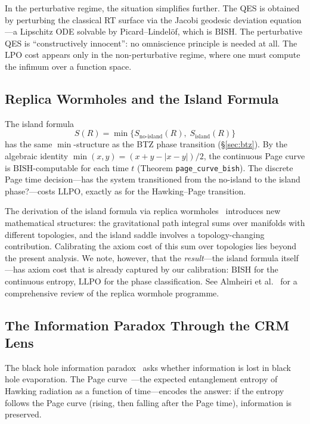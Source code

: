 \documentclass[11pt,a4paper]{article}
\theoremstyle{plain}
\theoremstyle{definition}
\newcommand{\LPO}{\ensuremath{\mathrm{LPO}}}
\newcommand{\LLPO}{\ensuremath{\mathrm{LLPO}}}
\newcommand{\BISH}{\ensuremath{\mathrm{BISH}}}
\begin{document}
In the perturbative regime, the situation simplifies further.
The QES is obtained by perturbing the classical RT surface via the
Jacobi geodesic deviation equation---a Lipschitz ODE solvable by
Picard--Lindel\"of, which is $\BISH$.  The perturbative QES is
``constructively innocent'': no omniscience principle is needed at all.
The $\LPO$ cost appears only in the non-perturbative regime, where
one must compute the infimum over a function space.

\subsection{Replica Wormholes and the Island Formula}

The island formula~\cite{AEMM2019,Penington2019}
\[
  S(R) = \min\bigl\{S_{\text{no-island}}(R),\;
  S_{\text{island}}(R)\bigr\}
\]
has the same $\min$-structure as the BTZ phase transition (\S\ref{sec:btz}).
By the algebraic identity $\min(x,y) = (x+y-|x-y|)/2$,
the continuous Page curve is $\BISH$-computable for each time $t$
(Theorem \texttt{page\_curve\_bish}).  The discrete Page time
decision---has the system transitioned from the no-island to the
island phase?---costs $\LLPO$, exactly as for the Hawking--Page transition.

The derivation of the island formula via replica
wormholes~\cite{AHMST2020,PSSY2022} introduces new mathematical
structures: the gravitational path integral sums over manifolds
with different topologies, and the island saddle involves a
topology-changing contribution.  Calibrating the axiom cost of this
sum over topologies lies beyond the present analysis.  We note,
however, that the \emph{result}---the island formula itself---has
axiom cost that is already captured by our calibration:
$\BISH$ for the continuous entropy, $\LLPO$ for the phase classification.
See Almheiri et al.~\cite{AHMST2021RMP} for a comprehensive review
of the replica wormhole programme.

\subsection{The Information Paradox Through the CRM Lens}

The black hole information paradox~\cite{Hawking1975,Page1993}
asks whether information is lost in black hole evaporation.
The Page curve~\cite{Page1993}---the expected entanglement entropy
of Hawking radiation as a function of time---encodes the answer:
if the entropy follows the Page curve (rising, then falling after the
Page time), information is preserved.
\end{document}
